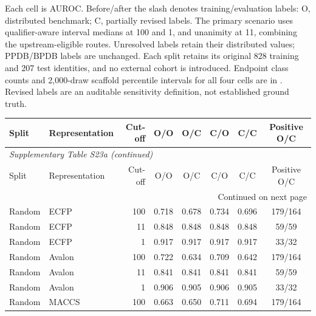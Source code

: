 Each cell is AUROC. Before/after the slash denotes training/evaluation labels: O, distributed benchmark; C, partially revised labels. The primary scenario uses qualifier-aware interval medians at 100 and 1, and unanimity at 11, combining the upstream-eligible routes. Unresolved labels retain their distributed values; PPDB/BPDB labels are unchanged. Each split retains its original 828 training and 207 test identities, and no external cohort is introduced. Endpoint class counts and 2,000-draw scaffold percentile intervals for all four cells are in . Revised labels are an auditable sensitivity definition, not established ground truth.

\begingroup\footnotesize\setlength{\tabcolsep}{4pt}

\begin{longtable}{llrccccc}

\toprule Split & Representation & Cut-off & O/O & O/C & C/O & C/C & Positive O/C \\ \midrule\endfirsthead

\multicolumn{8}{l}{\textit{Supplementary Table S23a (continued)}} \\

\toprule Split & Representation & Cut-off & O/O & O/C & C/O & C/C & Positive O/C \\ \midrule\endhead

\midrule\multicolumn{8}{r}{Continued on next page}\\\endfoot\bottomrule\endlastfoot

Random & ECFP & 100 & 0.718 & 0.678 & 0.734 & 0.696 & 179/164 \\

Random & ECFP & 11 & 0.848 & 0.848 & 0.848 & 0.848 & 59/59 \\

Random & ECFP & 1 & 0.917 & 0.917 & 0.917 & 0.917 & 33/32 \\

Random & Avalon & 100 & 0.722 & 0.634 & 0.709 & 0.642 & 179/164 \\

Random & Avalon & 11 & 0.841 & 0.841 & 0.841 & 0.841 & 59/59 \\

Random & Avalon & 1 & 0.906 & 0.905 & 0.906 & 0.905 & 33/32 \\

Random & MACCS & 100 & 0.663 & 0.650 & 0.711 & 0.694 & 179/164 \\


\end{longtable}

